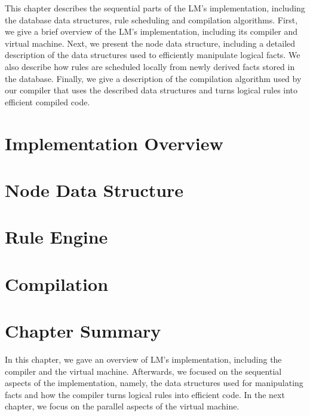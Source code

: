 
This chapter describes the sequential parts of the LM's implementation,
including the database data structures, rule scheduling and compilation
algorithms. First, we give a brief overview of the LM's implementation,
including its compiler and virtual machine. Next, we present the node data
structure, including a detailed description of the data structures used to
efficiently manipulate logical facts. We also describe how rules are scheduled
locally from newly derived facts stored in the database.  Finally, we give a
description of the compilation algorithm used by our compiler that uses the
described data structures and turns logical rules into efficient compiled code.

\section{Implementation Overview}


\section{Node Data Structure}\label{sec:data_structures}


\section{Rule Engine}\label{section:local:rule_engine}\label{sec:implementation:rule_engine}


\section{Compilation}


\section{Chapter Summary}

In this chapter, we gave an overview of LM's implementation, including the
compiler and the virtual machine. Afterwards, we focused on the sequential
aspects of the implementation, namely, the data structures used for manipulating
facts and how the compiler turns logical rules into efficient code. In the next
chapter, we focus on the parallel aspects of the virtual machine.
